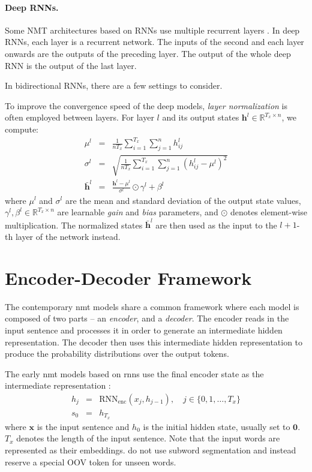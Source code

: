 \paragraph{Deep RNNs.} Some NMT architectures based on RNNs use multiple
recurrent layers \citep{barone2017deep,wu2016google}. In deep RNNs, each layer
is a recurrent network. The inputs of the second and each layer onwards are the
outputs of the preceding layer. The output of the whole deep RNN is the output
of the last layer.

In bidirectional RNNs, there are a few settings to consider. 

To improve the convergence speed of the deep models, \emph{layer normalization}
\citep{ba2016layer} is often employed between layers. For layer $l$ and its
output states
$\mathbf{h}^l \in \mathbb{R}^{T_x \times n}$, we compute:
%
\begin{eqnarray}
  \mu^l & = & \frac{1}{nT_x} \sum_{i=1}^{T_x}\sum_{j=1}^n h^l_{ij} \\
  \sigma^l & = & \sqrt{\frac{1}{nT_x} \sum_{i=1}^{T_x}\sum_{j=1}^n (h^l_{ij} - \mu^l)^2} \\
  \bar{\mathbf{h}}^l & = & \frac{\mathbf{h}^l - \mu^l}{\sigma^l} \odot \gamma^l + \beta^l
\end{eqnarray}
%
where $\mu^l$ and $\sigma^l$ are the mean and standard deviation of the output
state values, $\gamma^l, \beta^l \in \mathbb{R}^{T_x \times n}$ are learnable
\emph{gain} and \emph{bias} parameters, and $\odot$ denotes element-wise
multiplication. The normalized states $\bar{\mathbf{h}}^l$ are then used as the
input to the $l+1$-th layer of the network instead.


\section{Encoder-Decoder Framework}
\label{sec:encdec}

The contemporary \gls{nmt} models share a common framework where each model is
composed of two parts -- an \emph{encoder}, and a \emph{decoder}. The encoder
reads in the input sentence and processes it in order to generate an
intermediate hidden representation.  The decoder then uses this intermediate
hidden representation to produce the probability distributions over the output
tokens.

The early \gls{nmt} models based on \glspl{rnn} use the final encoder state as
the intermediate representation \citep{sutskever2014sequence}:
%
\begin{eqnarray} h_j & = & \mathrm{RNN}_{\text{enc}}(x_j, h_{j-1}), \quad j \in
\{0, 1, \ldots, T_x \} \\ s_0 & = & h_{T_x}
\end{eqnarray}
%
where $\mathbf{x}$ is the input sentence and $h_0$ is the initial hidden state,
usually set to $\mathbf{0}$. $T_x$ denotes the length of the input sentence.
Note that the input words are represented as their embeddings.
\citet{sutskever2014sequence} do not use subword segmentation and instead
reserve a special OOV token for unseen words.

